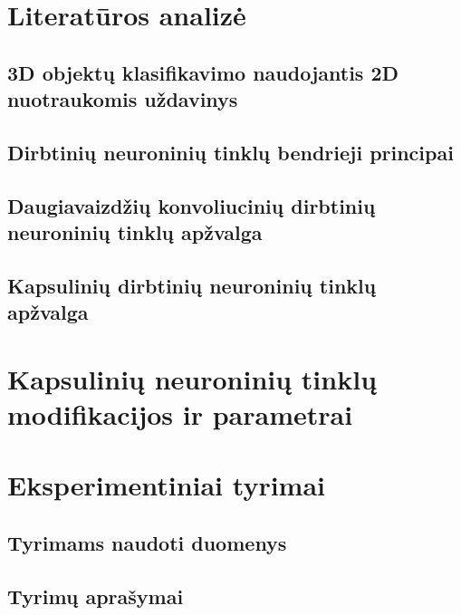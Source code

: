 \documentclass{VUMIFInfMagistrinis}
\begin{document}


\section{Literatūros analizė}

\subsection{3D objektų klasifikavimo naudojantis 2D nuotraukomis uždavinys}


\subsection{Dirbtinių neuroninių tinklų bendrieji principai}




\subsection{Daugiavaizdžių konvoliucinių dirbtinių neuroninių tinklų apžvalga}




\subsection{Kapsulinių dirbtinių neuroninių tinklų apžvalga}


\section{Kapsulinių neuroninių tinklų modifikacijos ir parametrai}


\section{Eksperimentiniai tyrimai}

\subsection{Tyrimams naudoti duomenys}


\subsection{Tyrimų aprašymai}

\end{document}

